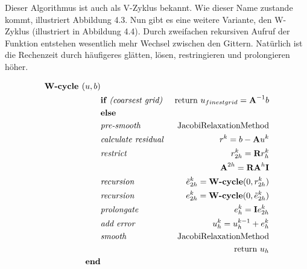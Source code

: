 Dieser Algorithmus ist auch als V-Zyklus bekannt. Wie dieser Name zustande kommt, illustriert Abbildung 4.3. Nun gibt es eine weitere Variante, den W-Zyklus (illustriert in Abbildung 4.4). Durch zweifachen rekursiven Aufruf der Funktion entstehen wesentlich mehr Wechsel zwischen den Gittern. Natürlich ist die Rechenzeit durch häufigeres glätten, lösen, restringieren und prolongieren höher.

\begin{eqnarray}
\textbf{W-cycle }(u,b)                         & \notag \\
&\textbf{if }\textit{(coarsest grid) }&\textnormal{return } u_{finest grid}={\textbf{A}}^{-1}b \notag \\
&\textbf{else }                                                & \notag \\
&\textit{pre-smooth }                                 &\textnormal{JacobiRelaxationMethod} \notag \\
&\textit{calculate residual }                &r^{k} = b - {\textbf{A}}u^{k} \notag \\
&\textit{restrict }                                 &r^{k}_{2h}={\textbf{R}}r^{k}_{h} \notag \\
&                                                                        &{\textbf{A}}^{2h} = {\textbf{R}}{\textbf{A}}^{h}{\textbf{I}} \notag \\
&\textit{recursion }                                &\tilde e^{k}_{2h} = \textbf{W-cycle}(0,r^{k}_{2h}) \notag \\
&\textit{recursion }                                &e^{k}_{2h} = \textbf{W-cycle}(0,\tilde e^{k}_{2h}) \notag \\
&\textit{prolongate }                                &e^{k}_{h} = {\textbf{I}}e^{k}_{2h} \notag \\
&\textit{add error }                                &u^{k}_{h} = u^{k-1}_{h} + e^{k}_{h} \notag \\
&\textit{smooth }                                        &\textnormal{JacobiRelaxationMethod} \notag \\
&                                                                        &\textnormal{return } u_{h} \notag \\
\textbf{end}                                                & \notag
\end{eqnarray}

 \label{W-Cycle}

